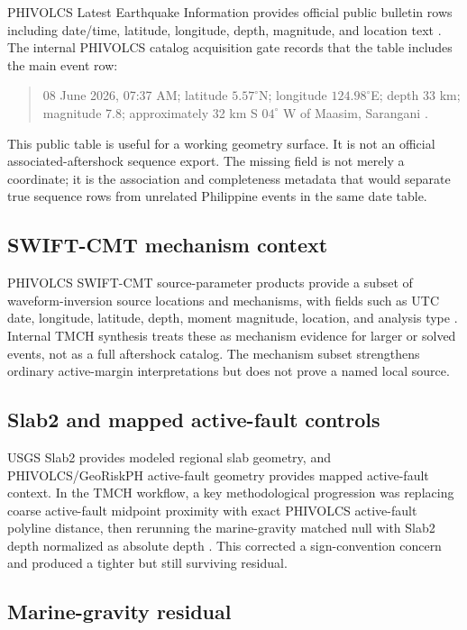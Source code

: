 \documentclass[11pt]{article}
\begin{document}
PHIVOLCS Latest Earthquake Information provides official public bulletin rows including date/time, latitude, longitude, depth, magnitude, and location text \cite{phivolcs-latest}. The internal PHIVOLCS catalog acquisition gate records that the table includes the main event row:
\begin{quote}
08 June 2026, 07:37 AM; latitude $5.57^\circ$N; longitude $124.98^\circ$E; depth 33 km; magnitude 7.8; approximately 32 km S $04^\circ$ W of Maasim, Sarangani \cite{phivolcs-catalog-gate}.
\end{quote}

This public table is useful for a working geometry surface. It is not an official associated-aftershock sequence export. The missing field is not merely a coordinate; it is the association and completeness metadata that would separate true sequence rows from unrelated Philippine events in the same date table.

\subsection{SWIFT-CMT mechanism context}

PHIVOLCS SWIFT-CMT source-parameter products provide a subset of waveform-inversion source locations and mechanisms, with fields such as UTC date, longitude, latitude, depth, moment magnitude, location, and analysis type \cite{phivolcs-swift}. Internal TMCH synthesis treats these as mechanism evidence for larger or solved events, not as a full aftershock catalog. The mechanism subset strengthens ordinary active-margin interpretations but does not prove a named local source.

\subsection{Slab2 and mapped active-fault controls}

USGS Slab2 provides modeled regional slab geometry, and PHIVOLCS/GeoRiskPH active-fault geometry provides mapped active-fault context. In the TMCH workflow, a key methodological progression was replacing coarse active-fault midpoint proximity with exact PHIVOLCS active-fault polyline distance, then rerunning the marine-gravity matched null with Slab2 depth normalized as absolute depth \cite{tmch-v05}. This corrected a sign-convention concern and produced a tighter but still surviving residual.

\subsection{Marine-gravity residual}
\end{document}
